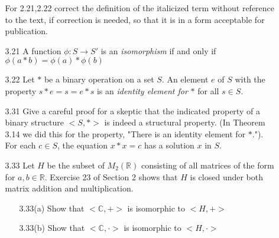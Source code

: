 \documentclass[12pt]{article}
\newcommand{\C}{\mathbb{C}}
\newcommand{\R}{\mathbb{R}}
\begin{document}
\begin{enumerate}
\begin{enumerate}
\begin{enumerate}
			\end{enumerate}
			
			
			For 2.21,2.22 correct the definition of the italicized term without  reference to the text, if correction is needed, so that it is in a form acceptable for publication.
			
			\item[3.21] A function $\phi:S \rightarrow S'$ is an \textit{isomorphism} if and only if $\phi(a\ast b) = \phi(a) \ast \phi(b)$
			
			\item[3.22] Let $\ast$ be a binary operation on a set $S$. An element $e$ of $S$ with the property $s \ast e = s = e  \ast s$ is an \textit{identity element for} $\ast$ for all $s \in S$.
			
			\item[3.31] Give a careful proof for a skeptic that the indicated property of a binary structure $<S,\ast>$ is indeed a structural property. (In Theorem 3.14 we did this for the property, "There is an identity element for $\ast$."). For each $c \in S$, the equation $x \ast x = c$ has a solution $x$ in $S$.
			
			\item[3.33] Let $H$ be the subset of $M_2(\R)$ consisting of all matrices of the form for $a,b \in \R$. Exercise 23 of Section 2 shows that $H$ is closed under both matrix addition and multiplication.
			
			\begin{enumerate}
				\item[3.33(a)] Show that $<\C,+>$ is isomorphic to $<H,+>$ 
				\item[3.33(b)] Show that $<\C,\cdot>$ is isomorphic to $<H,\cdot>$
			\end{enumerate}
		\end{enumerate}
		
		
	\end{enumerate}
\end{document}
